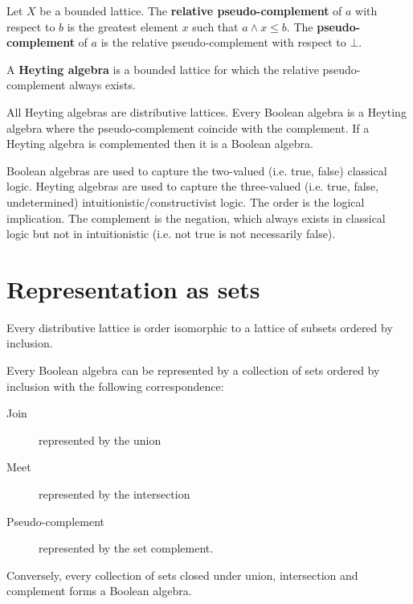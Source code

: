 \documentclass{article}
\newcommand{\marginleft}[1] {\reversemarginpar\marginpar{#1}}
\begin{document}
\begin{defn}
	Let $X$ be \marginleft{Pseudo-complement} a bounded lattice. The \textbf{relative pseudo-complement} of $a$ with respect to $b$ is the greatest element $x$ such that $a \wedge x \leq b$. The \textbf{pseudo-complement} of $a$ is the relative pseudo-complement with respect to $\bot$.
\end{defn}

\begin{defn}
	A \textbf{Heyting algebra} \marginleft{Heyting algebra} is a bounded lattice for which the relative pseudo-complement always exists.
\end{defn}

\begin{prop}
	All Heyting algebras are distributive lattices. Every Boolean algebra is a Heyting algebra where the pseudo-complement coincide with the complement. If a Heyting algebra is complemented then it is a Boolean algebra.
\end{prop}

\begin{remark}
	Boolean algebras are used to capture the two-valued (i.e. true, false) classical logic. Heyting algebras are used to capture the three-valued (i.e. true, false, undetermined) intuitionistic/constructivist logic. The order is the logical implication. The complement is the negation, which always exists in classical logic but not in intuitionistic (i.e. not true is not necessarily false).
\end{remark}

\section{Representation as sets}

\begin{prop}
	Every distributive lattice is order isomorphic to a lattice of subsets ordered by inclusion.
\end{prop}

\begin{prop}
	Every Boolean algebra can be represented by a collection of sets ordered by inclusion with the following correspondence:
	\begin{description}
		\item[Join] represented by the union
		\item[Meet] represented by the intersection
		\item[Pseudo-complement] represented by the set complement.
	\end{description}
	Conversely, every collection of sets closed under union, intersection and complement forms a Boolean algebra.
\end{prop}
\end{document}
